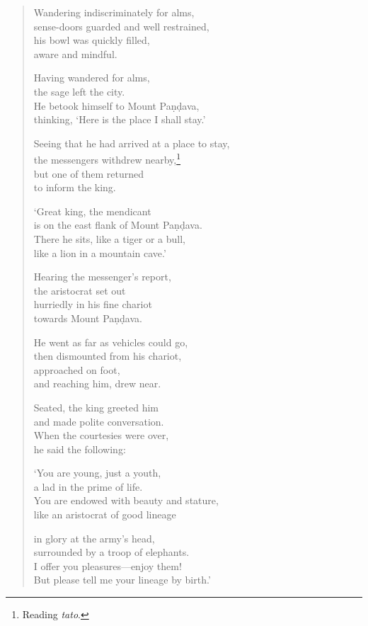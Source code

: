 \documentclass[12pt,openany]{book}%
\begin{document}
\begin{verse}
Wandering indiscriminately for alms, \\
sense-doors guarded and well restrained, \\
his bowl was quickly filled, \\
aware and mindful. 

Having wandered for alms, \\
the sage left the city. \\
He betook himself to Mount \textsanskrit{Paṇḍava}, \\
thinking, ‘Here is the place I shall stay.’ 

Seeing that he had arrived at a place to stay, \\
the messengers withdrew nearby,\footnote{Reading \textit{tato}. } \\
but one of them returned \\
to inform the king. 

‘Great king, the mendicant \\
is on the east flank of Mount \textsanskrit{Paṇḍava}. \\
There he sits, like a tiger or a bull, \\
like a lion in a mountain cave.’ 

Hearing the messenger’s report, \\
the aristocrat set out \\
hurriedly in his fine chariot \\
towards Mount \textsanskrit{Paṇḍava}. 

He went as far as vehicles could go, \\
then dismounted from his chariot, \\
approached on foot, \\
and reaching him, drew near. 

Seated, the king greeted him \\
and made polite conversation. \\
When the courtesies were over, \\
he said the following: 

‘You are young, just a youth, \\
a lad in the prime of life. \\
You are endowed with beauty and stature, \\
like an aristocrat of good lineage 

in glory at the army’s head, \\
surrounded by a troop of elephants. \\
I offer you pleasures—enjoy them! \\
But please tell me your lineage by birth.’ 


\end{verse}
\end{document}
